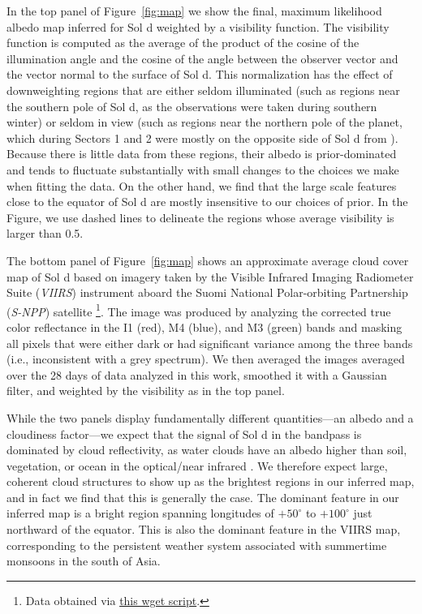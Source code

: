 \documentclass[modern]{aastex62}
\begin{document}
In the top panel of Figure~\ref{fig:map} we show the final,
maximum likelihood albedo map inferred for Sol d weighted by a visibility function.
The visibility function is computed as the average of the product of the 
cosine of the illumination angle and the cosine of the angle between the 
observer vector and the vector normal to the surface of Sol d. This normalization
has the effect of downweighting regions that are either seldom illuminated (such
as regions near the southern pole of Sol d, as the observations were taken during
southern winter) or seldom in view (such as regions near the northern pole of the planet,
which during Sectors 1 and 2 were mostly on the opposite side of Sol d from \TESS).
Because there is little data from these regions, their albedo is prior-dominated
and tends to fluctuate substantially with small changes to the choices we make
when fitting the data. On the other hand, we find that the large scale features close to
the equator of Sol d are mostly insensitive to our choices of prior. In the Figure,
we use dashed lines to delineate the regions whose average visibility is larger
than 0.5.

The bottom panel of Figure~\ref{fig:map} shows an approximate average
cloud cover map of Sol d based on imagery taken by the
Visible Infrared Imaging Radiometer Suite (\emph{VIIRS}) instrument aboard the 
Suomi National Polar-orbiting Partnership (\emph{S-NPP}) satellite%
\footnote{Data obtained via 
\href{https://github.com/rodluger/earthshine/blob/master/tex/figures/viirs.sh}{this wget script}.}. 
The image was produced by analyzing the corrected true color reflectance in the
I1 (red), M4 (blue), and M3 (green) bands and masking
all pixels that were either dark or had significant variance among the three
bands (i.e., inconsistent with a grey spectrum). We then averaged the images
averaged over the 28 days of data analyzed in this work, smoothed it 
with a Gaussian filter, and weighted by the \TESS visibility as in the top panel.

While the two panels display fundamentally different quantities---an albedo
and a cloudiness factor---we expect that the signal of Sol d in the \TESS
bandpass is dominated by cloud reflectivity, as water clouds have an albedo
higher than soil, vegetation, or ocean in the optical/near infrared
\citep[e.g.,][]{Jedlovec2009}. We therefore
expect large, coherent cloud structures to show up as the brightest regions 
in our inferred map, and in fact we find that this is generally the case. The
dominant feature in our inferred map is a bright region spanning longitudes
of $+50^\circ$ to $+100^\circ$ just northward of the equator. This is also the
dominant feature in the VIIRS map, corresponding to the persistent weather system
associated with summertime monsoons in the south of Asia.
\end{document}
